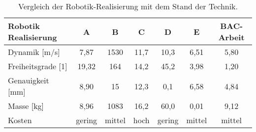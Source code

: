 \begin{table}[H]
    \centering
    \setlength{\arrayrulewidth}{0.1mm}
    \setlength{\tabcolsep}{7pt}
    \renewcommand{\arraystretch}{1.8}
    \begin{tabular}{ |p{4cm}|c|c|c|c|c|c| }
        \hline
        Robotik Realisierung & A\cite{publikation:publikationtitel1} & B\cite{publikation:publikationtitel2} & C\cite{buch:buchtitel1} & D\cite{zeitschrift:zeitschrifttitel1} & E\cite{web:webseite1} & BAC-Arbeit \\
        \hline
        Dynamik [m/s]        & 7,87                                  & 1530                                  & 11,7                    & 10,3                                  & 6,51                  & 5,80       \\
        Freiheitsgrade [1]   & 19,32                                 & 164                                   & 14,2                    & 45,2                                  & 3,98                  & 1,20       \\
        Genauigkeit [mm]     & 8,90                                  & 15                                    & 12,3                    & 0,1                                   & 6,58                  & 4,84       \\
        Masse [kg]           & 8,96                                  & 1083                                  & 16,2                    & 60,0                                  & 0,01                  & 9,12       \\
        Kosten               & gering                                & mittel                                & hoch                    & gering                                & mittel                & mittel     \\
        \hline
    \end{tabular}
    \caption{Vergleich der Robotik-Realisierung mit dem Stand der Technik.}
    \label{tab:Tabelle3}
\end{table}